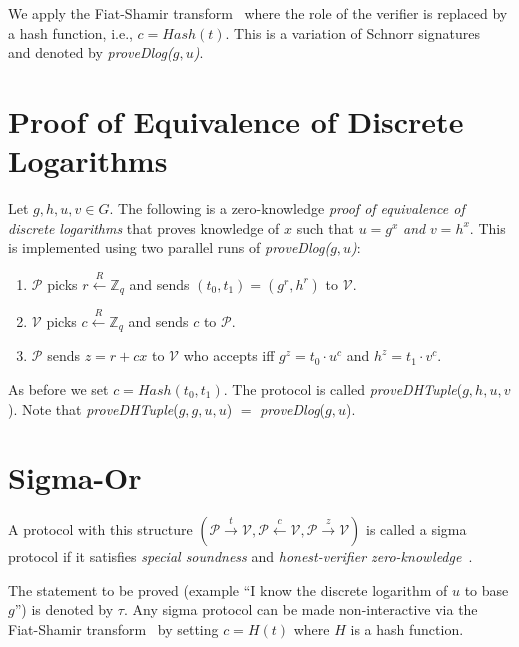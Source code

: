 \documentclass[runningheads]{llncs}
\begin{document}
We apply the Fiat-Shamir transform~\cite{fiatshamir} where the role of the verifier is replaced by a hash function, i.e., $c = Hash(t)$.
This is a variation of Schnorr signatures~\cite{Sch91} and denoted by \emph{proveDlog($g, u$)}.

\section{Proof of Equivalence of Discrete Logarithms}
\label{provedhtuple}
Let $g, h, u, v \in G$. The following is a zero-knowledge {\em proof of equivalence of discrete logarithms} that proves knowledge of $x$ such that $u = g^x$ {\em and} $v = h^x$. This is implemented using two parallel runs of \emph{proveDlog($g, u$)}:

\begin{enumerate}
\item $\mathcal{P}$ picks $r \stackrel{R}{\leftarrow} \mathbb{Z}_q$ and sends $(t_0, t_1) = ({g}^r, {h}^r)$ to $\mathcal{V}$.
\item $\mathcal{V}$ picks $c \stackrel{R}{\leftarrow} \mathbb{Z}_q$ and sends $c$ to $\mathcal{P}$.
\item $\mathcal{P}$ sends $z = r + cx$ to $\mathcal{V}$ who accepts iff ${g}^z = {t_0}\cdot {u}^c$ and $h^z=t_1\cdot v^c$.
\end{enumerate}

As before we set $c = Hash(t_0, t_1)$. The protocol is called \emph{proveDHTuple}($g, h, u, v$). Note that \emph{proveDHTuple}($g, g, u, u$) $=$ \emph{proveDlog}($g, u$).

\section{Sigma-Or}
\label{sigmaor}
A protocol with this structure $(\mathcal{P} \stackrel{t}{\rightarrow}\mathcal{V}, \mathcal{P} \stackrel{c}{\leftarrow}\mathcal{V}, \mathcal{P} \stackrel{z}{\rightarrow}\mathcal{V})$ is called a sigma protocol if it satisfies {\em special soundness} and {\em honest-verifier zero-knowledge}~\cite{Dam10}.

The statement to be proved (example ``I know the discrete logarithm of $u$ to base $g$'') is denoted by $\tau$.
Any sigma protocol can be made non-interactive via the Fiat-Shamir transform~\cite{fiatshamir} by setting $c= H(t)$ where $H$ is a hash function.
\end{document}
